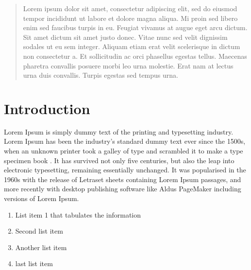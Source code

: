 \documentclass[11pt, fullpage]{article}
\begin{document}
\begin{acknowledgements}
\end{acknowledgements}

\begin{abstract}
    \doublespacing
    Lorem ipsum dolor sit amet, consectetur adipiscing elit, sed do eiusmod tempor incididunt ut labore et dolore magna aliqua. Mi proin sed libero enim sed faucibus turpis in eu. Feugiat vivamus at augue eget arcu dictum. Sit amet dictum sit amet justo donec. Vitae nunc sed velit dignissim sodales ut eu sem integer. Aliquam etiam erat velit scelerisque in dictum non consectetur a. Et sollicitudin ac orci phasellus egestas tellus. Maecenas pharetra convallis posuere morbi leo urna molestie. Erat nam at lectus urna duis convallis. Turpis egestas sed tempus urna.
    \cleardoublepage
    \singlespacing
\end{abstract}

\copyrighttrue
\makecontentspages


\section[\bf \uppercase{Sample Introduction}]{Introduction}

Lorem Ipsum is simply dummy text of the printing and typesetting industry. Lorem Ipsum has been the industry's standard dummy text ever since the 1500s, when an unknown printer took a galley of type and scrambled it to make a type specimen book \cite{gridftp}. It has survived not only five centuries, but also the leap into electronic typesetting, remaining essentially unchanged. It was popularised in the 1960s with the release of Letraset sheets containing Lorem Ipsum passages, and more recently with desktop publishing software like Aldus PageMaker including versions of Lorem Ipsum.
\begin{enumerate}
\item
List item 1 that tabulates the information
\item
Second list item
\item
Another list item
\item
last list item
\end{enumerate}
\end{document}
